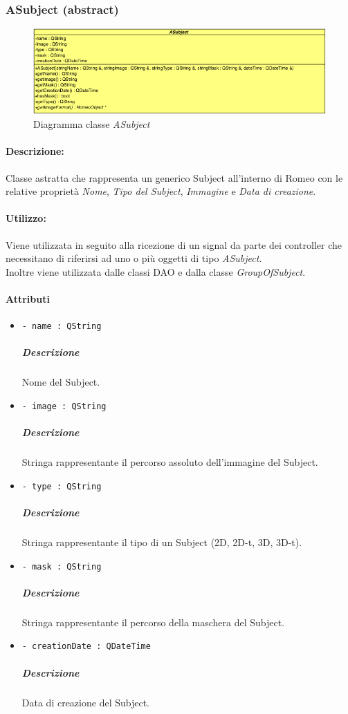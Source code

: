 	\subsubsection{ASubject (abstract)}
	\begin{figure}[!h]
		\centering
		\includegraphics[scale=2.75]{./Content/Immagini/modelCore/ASubject}
		\caption{Diagramma classe \textsl{ASubject}}
	\end{figure}
	\paragraph{Descrizione:} Classe astratta che rappresenta un generico Subject\g{} all'interno di Romeo\g{} con le relative proprietà \textsl{Nome}, \textsl{Tipo del Subject\g{}}, \textsl{Immagine} e \textsl{Data di creazione}.
	\paragraph{Utilizzo:} Viene utilizzata in seguito alla ricezione di un signal\g{} da
parte dei controller che necessitano di riferirsi ad uno o più oggetti di tipo \textsl{ASubject}.
\\Inoltre viene utilizzata dalle classi DAO e dalla classe \textsl{GroupOfSubject}.
	\paragraph{Attributi}
		\begin{itemize}
			\item \color{teal} \verb!- name : QString!
			\color{black}
			\subparagraph{Descrizione} Nome del Subject\g{}.
			\item \color{teal} \verb!- image : QString!
			\color{black}
			\subparagraph{Descrizione} Stringa rappresentante il percorso assoluto dell'immagine del Subject\g{}.
			\item \color{teal} \verb!- type : QString!
			\color{black}
			\subparagraph{Descrizione} Stringa rappresentante il tipo di un Subject\g{} (2D, 2D-t, 3D, 3D-t).
			\item \color{teal} \verb!- mask : QString!
			\color{black}
			\subparagraph{Descrizione} Stringa rappresentante il percorso della maschera del Subject\g{}.
			\item \color{teal} \verb!- creationDate : QDateTime!
			\color{black}
			\subparagraph{Descrizione} Data di creazione del Subject\g{}.
		\end{itemize}
